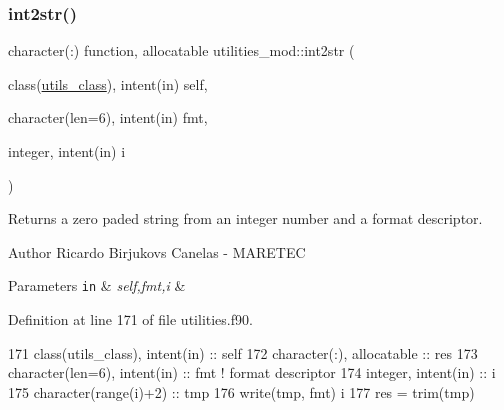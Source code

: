 \subsubsection{\texorpdfstring{int2str()}{int2str()}}
{\footnotesize\ttfamily character(\+:) function, allocatable utilities\+\_\+mod\+::int2str (\begin{DoxyParamCaption}\item[{class(\mbox{\hyperlink{structutilities__mod_1_1utils__class}{utils\+\_\+class}}), intent(in)}]{self,  }\item[{character(len=6), intent(in)}]{fmt,  }\item[{integer, intent(in)}]{i }\end{DoxyParamCaption})\hspace{0.3cm}{\ttfamily [private]}}



Returns a zero paded string from an integer number and a format descriptor. 

\begin{DoxyAuthor}{Author}
Ricardo Birjukovs Canelas -\/ M\+A\+R\+E\+T\+EC 
\end{DoxyAuthor}

\begin{DoxyParams}[1]{Parameters}
\mbox{\tt in}  & {\em self,fmt,i} & \\
\hline
\end{DoxyParams}


Definition at line 171 of file utilities.\+f90.


\begin{DoxyCode}
171     \textcolor{keywordtype}{class}(utils\_class), \textcolor{keywordtype}{intent(in)} :: self
172     \textcolor{keywordtype}{character(:)}, \textcolor{keywordtype}{allocatable} :: res
173     \textcolor{keywordtype}{character(len=6)}, \textcolor{keywordtype}{intent(in)} :: fmt \textcolor{comment}{! format descriptor}
174     \textcolor{keywordtype}{integer}, \textcolor{keywordtype}{intent(in)} :: i
175     \textcolor{keywordtype}{character(range(i)+2)} :: tmp
176     \textcolor{keyword}{write}(tmp, fmt) i
177     res = trim(tmp)
\end{DoxyCode}
\mbox{\label{namespaceutilities__mod_ae6b8a45b229e3f1f8c2b12dd74e7a2dd}} 
